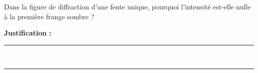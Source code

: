 Dans la figure de diffraction d'une fente unique, pourquoi l'intensité est-elle nulle à la première frange sombre ?

\choices

\noindent\textbf{Justification :} \hrulefill \\[2.5ex]
\rule{\linewidth}{0.4pt} \\[2.5ex]
\rule{\linewidth}{0.4pt}
\vfill

